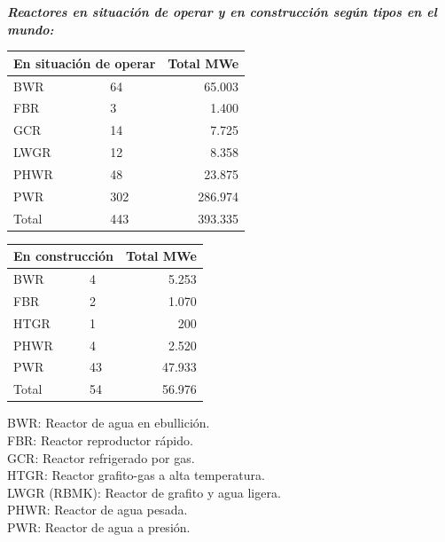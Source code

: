 				\textit{\textbf{Reactores en situación de operar y en construcción según tipos en el mundo:}}\\
				\begin{minipage}{0.5\textwidth}
					\centering
					\renewcommand{\arraystretch}{1.1}
					\begin{tabular}{llr}
						\hline
						\multicolumn{2}{c}{En situación de operar} & \multicolumn{1}{c}{Total MWe} \\ \hline
						BWR & 64 & 65.003 \\
						FBR & 3 & 1.400 \\
						GCR & 14 & 7.725 \\
						LWGR & 12 & 8.358 \\
						PHWR & 48 & 23.875 \\
						PWR & 302 & 286.974 \\
						\hline
						Total & 443 & 393.335 \\ 
						\hline
					\end{tabular}
				\end{minipage}
				\begin{minipage}{0.5\textwidth}
					\centering
					\renewcommand{\arraystretch}{1.1}
					\begin{tabular}{llr}
						\hline
						\multicolumn{2}{c}{En construcción} & \multicolumn{1}{c}{Total MWe} \\ 
						\hline
						BWR	&	4	&	5.253\\	
						FBR	&	2	&	1.070\\	
						HTGR&  	1  	&  	200\\	
						PHWR&   	4   	&   	  2.520\\	
						PWR&43&47.933\\ 
						\hline	
						Total & 54&56.976\\ 
						\hline	    					
					\end{tabular}
				\end{minipage}
				
				\begin{center}
					BWR: Reactor de agua en ebullición.\\
					\indent FBR: Reactor reproductor rápido.\\
					\indent GCR: Reactor refrigerado por gas.\\
					\indent HTGR: Reactor grafito-gas a alta temperatura.\\
					\indent LWGR (RBMK): Reactor de grafito y agua ligera.\\
					\indent PHWR: Reactor de agua pesada.\\
					\indent PWR: Reactor de agua a presión.\\
				\end{center}				
			
